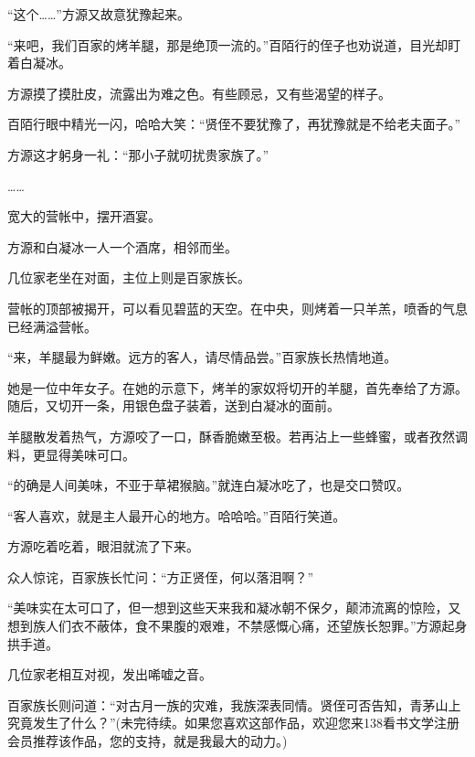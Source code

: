 \begin{this_body}
“这个……”方源又故意犹豫起来。

“来吧，我们百家的烤羊腿，那是绝顶一流的。”百陌行的侄子也劝说道，目光却盯着白凝冰。

方源摸了摸肚皮，流露出为难之色。有些顾忌，又有些渴望的样子。

百陌行眼中精光一闪，哈哈大笑：“贤侄不要犹豫了，再犹豫就是不给老夫面子。”

方源这才躬身一礼：“那小子就叨扰贵家族了。”

……

宽大的营帐中，摆开酒宴。

方源和白凝冰一人一个酒席，相邻而坐。

几位家老坐在对面，主位上则是百家族长。

营帐的顶部被揭开，可以看见碧蓝的天空。在中央，则烤着一只羊羔，喷香的气息已经满溢营帐。

“来，羊腿最为鲜嫩。远方的客人，请尽情品尝。”百家族长热情地道。

她是一位中年女子。在她的示意下，烤羊的家奴将切开的羊腿，首先奉给了方源。随后，又切开一条，用银色盘子装着，送到白凝冰的面前。

羊腿散发着热气，方源咬了一口，酥香脆嫩至极。若再沾上一些蜂蜜，或者孜然调料，更显得美味可口。

“的确是人间美味，不亚于草裙猴脑。”就连白凝冰吃了，也是交口赞叹。

“客人喜欢，就是主人最开心的地方。哈哈哈。”百陌行笑道。

方源吃着吃着，眼泪就流了下来。

众人惊诧，百家族长忙问：“方正贤侄，何以落泪啊？”

“美味实在太可口了，但一想到这些天来我和凝冰朝不保夕，颠沛流离的惊险，又想到族人们衣不蔽体，食不果腹的艰难，不禁感慨心痛，还望族长恕罪。”方源起身拱手道。

几位家老相互对视，发出唏嘘之音。

百家族长则问道：“对古月一族的灾难，我族深表同情。贤侄可否告知，青茅山上究竟发生了什么？”(未完待续。如果您喜欢这部作品，欢迎您来138看书文学注册会员推荐该作品，您的支持，就是我最大的动力。)

\end{this_body}

